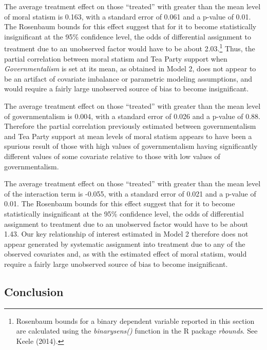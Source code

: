 \documentclass[12pt,]{article}
\begin{document}
The average treatment effect on those ``treated'' with greater than the
mean level of moral statism is 0.163, with a standard error of 0.061 and
a p-value of 0.01. The Rosenbaum bounds for this effect suggest that for
it to become statistically insignificant at the 95\% confidence level,
the odds of differential assignment to treatment due to an unobserved
factor would have to be about 2.03.\footnote{Rosenbaum bounds for a
  binary dependent variable reported in this section are calculated
  using the \emph{binarysens()} function in the R package
  \emph{rbounds}. See Keele (2014).} Thus, the partial correlation
between moral statism and Tea Party support when \emph{Governmentalism}
is set at its mean, as obtained in Model 2, does not appear to be an
artifact of covariate imbalance or parametric modeling assumptions, and
would require a fairly large unobserved source of bias to become
insignificant.

The average treatment effect on those ``treated'' with greater than the
mean level of governmentalism is 0.004, with a standard error of 0.026
and a p-value of 0.88. Therefore the partial correlation previously
estimated between governmentalism and Tea Party support at mean levels
of moral statism appears to have been a spurious result of those with
high values of governmentalism having significantly different values of
some covariate relative to those with low values of governmentalism.

The average treatment effect on those ``treated'' with greater than the
mean level of the interaction term is -0.055, with a standard error of
0.021 and a p-value of 0.01. The Rosenbaum bounds for this effect
suggest that for it to become statistically insignificant at the 95\%
confidence level, the odds of differential assignment to treatment due
to an unobserved factor would have to be about 1.43. Our key
relationship of interest estimated in Model 2 therefore does not appear
generated by systematic assignment into treatment due to any of the
observed covariates and, as with the estimated effect of moral statism,
would require a fairly large unobserved source of bias to become
insignificant.

\subsection{Conclusion}\label{conclusion}
\end{document}
